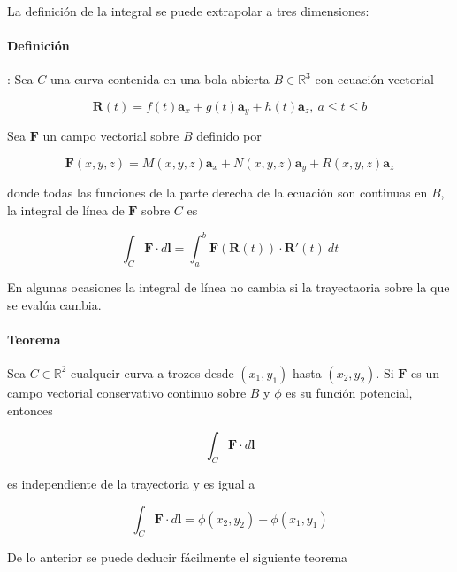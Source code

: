 La definición de la integral se puede extrapolar a tres dimensiones:

\paragraph*{Definición}: Sea $C$ una curva contenida en una bola abierta $B \in \mathbb{R}^3$ con ecuación vectorial

\begin{equation*}
\mathbf{R}(t) = f(t) \mathbf{a}_x  +  g(t) \mathbf{a}_y  +  h(t) \mathbf{a}_z, \ a \leq t \leq b 
\end{equation*}

Sea $\mathbf{F}$ un campo vectorial sobre $B$ definido por 

\begin{equation*}
\mathbf{F}(x,y,z) = M(x,y,z) \mathbf{a}_x  + N(x,y,z) \mathbf{a}_y  + R(x,y,z) \mathbf{a}_z
\end{equation*}

donde todas las funciones de la parte derecha de la ecuación son continuas en $B$, la integral de línea de $\mathbf{F}$ sobre $C$ es

\begin{equation*}
\int_C \mathbf{F} \cdot d \mathbf{l} = \int_{a}^{b} \mathbf{F}(\mathbf{R}(t)) \cdot \mathbf{R}'(t) \ dt
\end{equation*}

En algunas ocasiones la integral de línea no cambia si la trayectaoria sobre la que se evalúa cambia.

\paragraph*{Teorema} Sea $C \in \mathbb{R}^2$ cualqueir curva a trozos desde $(x_1,y_1)$ hasta $(x_2,y_2)$. Si $\mathbf{F}$ es un campo vectorial conservativo continuo sobre $B$ y $\phi$ es su función potencial, entonces

\begin{equation*}
\int_C \mathbf{F} \cdot d \mathbf{l}
\end{equation*}

es independiente de la trayectoria y es igual a 

\begin{equation*}
\int_C \mathbf{F} \cdot d \mathbf{l} = \phi(x_2,y_2) - \phi(x_1,y_1)
\end{equation*}

De lo anterior se puede deducir fácilmente el siguiente teorema

